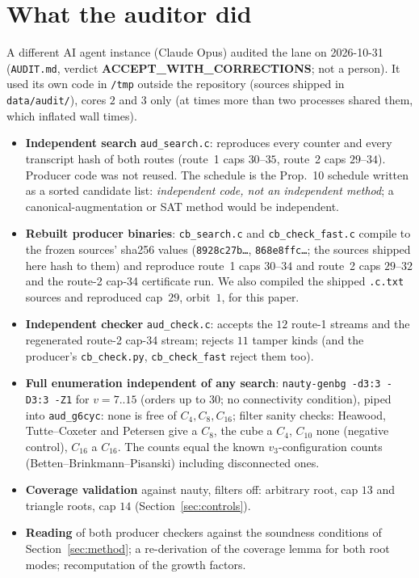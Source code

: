 \documentclass[10pt]{article}
\begin{document}
\section{What the auditor did}\label{sec:audit}
A different AI agent instance (Claude Opus) audited the lane on 2026-10-31 (\texttt{AUDIT.md}, verdict \textbf{ACCEPT\_WITH\_CORRECTIONS}; not a person). It used its own code in \texttt{/tmp} outside the repository (sources shipped in \texttt{data/audit/}), cores $2$ and $3$ only (at times more than two processes shared them, which inflated wall times).
\begin{itemize}\itemsep=1pt
\item \textbf{Independent search} \texttt{aud\_search.c}: reproduces every counter and every transcript hash of both routes (route~1 caps $30$--$35$, route~2 caps $29$--$34$). Producer code was not reused. The schedule is the Prop.~10 schedule written as a sorted candidate list: \emph{independent code, not an independent method}; a canonical-augmentation or SAT method would be independent.
\item \textbf{Rebuilt producer binaries}: \texttt{cb\_search.c} and \texttt{cb\_check\_fast.c} compile to the frozen sources' sha256 values (\texttt{8928c27b\dots}, \texttt{868e8ffc\dots}; the sources shipped here hash to them) and reproduce route~1 caps $30$--$34$ and route~2 caps $29$--$32$ and the route-2 cap-34 certificate run. We also compiled the shipped \texttt{.c.txt} sources and reproduced cap~$29$, orbit~$1$, for this paper.
\item \textbf{Independent checker} \texttt{aud\_check.c}: accepts the $12$ route-1 streams and the regenerated route-2 cap-34 stream; rejects $11$ tamper kinds (and the producer's \texttt{cb\_check.py}, \texttt{cb\_check\_fast} reject them too).
\item \textbf{Full enumeration independent of any search}: \texttt{nauty-genbg -d3:3 -D3:3 -Z1} for $v=7..15$ (orders up to $30$; no connectivity condition), piped into \texttt{aud\_g6cyc}: none is free of $C_4,C_8,C_{16}$; filter sanity checks: Heawood, Tutte--Coxeter and Petersen give a $C_8$, the cube a $C_4$, $C_{10}$ none (negative control), $C_{16}$ a $C_{16}$. The counts equal the known $v_3$-configuration counts (Betten--Brinkmann--Pisanski) including disconnected ones.
\item \textbf{Coverage validation} against nauty, filters off: arbitrary root, cap $13$ and triangle roots, cap $14$ (Section~\ref{sec:controls}).
\item \textbf{Reading} of both producer checkers against the soundness conditions of Section~\ref{sec:method}; a re-derivation of the coverage lemma for both root modes; recomputation of the growth factors.
\end{itemize}
\end{document}
